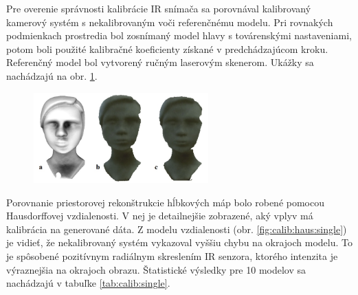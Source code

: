 
Pre overenie správnosti kalibrácie IR snímača sa porovnával kalibrovaný kamerový systém s nekalibrovaným voči referenčnému modelu. Pri rovnakých podmienkach prostredia bol zosnímaný model hlavy s továrenskými nastaveniami, potom boli použité kalibračné koeficienty získané v predchádzajúcom kroku. Referenčný model bol vytvorený ručným laserovým skenerom. Ukážky sa nachádzajú na obr. \ref{fig:calib:models}. 

\begin{figure}[H]
	\centering
	\includegraphics[width=0.6\textwidth]{figures/calibration_models.jpg}
	\caption{}
	\label{fig:calib:models}
\end{figure}

Porovnanie priestorovej rekonštrukcie hĺbkových máp bolo robené pomocou Hausdorffovej vzdialenosti. V nej je detailnejšie zobrazené, aký vplyv má kalibrácia na generované dáta. Z modelu vzdialenosti (obr. \ref{fig:calib:haus:single}) je vidieť, že nekalibrovaný systém vykazoval vyššiu chybu na okrajoch modelu. To je spôsobené pozitívnym radiálnym skreslením IR senzora, ktorého intenzita je výraznejšia na okrajoch obrazu. Štatistické výsledky pre 10 modelov sa nachádzajú v tabuľke \ref{tab:calib:single}.

